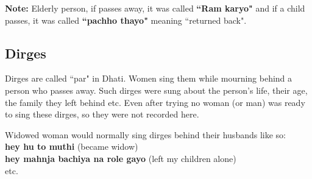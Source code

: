 \textbf{Note:} Elderly person, if passes away, it was called \textbf{``Ram
karyo"} and if a child passes, it was called \textbf{``pachho thayo"} meaning
``returned back".

\subsection{Dirges}
Dirges are called ``par" in Dhati. Women sing them while mourning behind a
person who passes away. Such dirges were sung about the person's life, their
age, the family they left behind etc. Even after trying no woman (or man) was
ready to sing these dirges, so they were not recorded here.

Widowed woman would normally sing dirges behind their husbands like so:\\
\textbf{hey hu to muthi} (became widow)\\
\textbf{hey mahnja bachiya na role gayo} (left my children alone)\\
etc.

